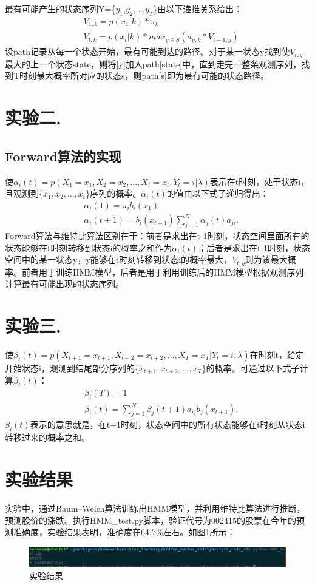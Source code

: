 \documentclass[a4paper,UTF8]{article}
\theoremstyle{definition}
\renewcommand\refname{参考文献}
\begin{document}
		最有可能产生的状态序列Y=\{$ y_1 $,$ y_2 $,...,$ y_T $\}由以下递推关系给出：
		\begin{align*}
			&V_{1,k} = p(x_1|k)*\pi_k \\
			&V_{t,k} = p(x_t|k)*max_{y\in S}(a_{y,k}*V_{t-1,y})
		\end{align*}
		设path记录从每一个状态开始，最有可能到达的路径。对于某一状态y找到使$ V_{t,y} $最大的上一个状态state，则将[y]加入path[state]中，直到走完一整条观测序列，找到T时刻最大概率所对应的状态s，则path[s]即为最有可能的状态路径。

\section*{实验二.}
	\subsection*{Forward算法的实现}
		使$ \alpha_i(t) = p(X_1=x_1,X_2=x_2,...,X_t=x_t,Y_t=i|\lambda)$表示在t时刻，处于状态i，且观测到\{$ x_1,x_2,...,x_t $\}序列的概率。$ \alpha_i(t) $的值由以下式子递归得出：
		\begin{align*}
			&\alpha_i(1) = \pi_i b_i(x_1) \\
			&\alpha_i(t+1) = b_i(x_{t+1}) \sum_{j=1}^N \alpha_j(t)a_{ji}.
		\end{align*}
		Forward算法与维特比算法区别在于：前者是求出在t-1时刻，状态空间里面所有的状态能够在t时刻转移到状态i的概率之和作为$ \alpha_i(t) $；后者是求出在t-1时刻，状态空间中的某一状态y，y能够在t时刻转移到状态i的概率最大，$ V_{t,y} $则为该最大概率。前者用于训练HMM模型，后者是用于利用训练后的HMM模型根据观测序列计算最有可能出现的状态序列。

\section*{实验三. }
	使$ \beta_i(t) = p(X_{t+1}=x_{t+1},X_{t+2}=x_{t+2},...,X_T=x_T|Y_t=i,\lambda)$在时刻t，给定开始状态i，观测到结尾部分序列的\{$x_{t+1},x_{t+2},...,x_T$\}的概率。可通过以下式子计算$ \beta_i(t) $：
	\begin{align*}
		&\beta_i(T) = 1 \\
		&\beta_i(t) = \sum_{j=1}^N \beta_j(t+1) a_{ij} b_j(x_{t+1}).
	\end{align*}
	$ \beta_i(t) $表示的意思就是，在t+1时刻，状态空间中的所有状态能够在t时刻从状态i转移过来的概率之和。
\section*{实验结果}
	实验中，通过Baum–Welch算法训练出HMM模型，并利用维特比算法进行推断，预测股价的涨跌。执行HMM\_test.py脚本，验证代号为002415的股票在今年的预测准确度，实验结果表明，准确度在64.7\%左右。如图1所示：
	
\begin{figure}[htbp]
\centering\includegraphics[width=5in]{result.png}
\caption{实验结果}
\label{fig:1}
\end{figure}
	
\renewcommand\refname{参考文献}


\end{document}

